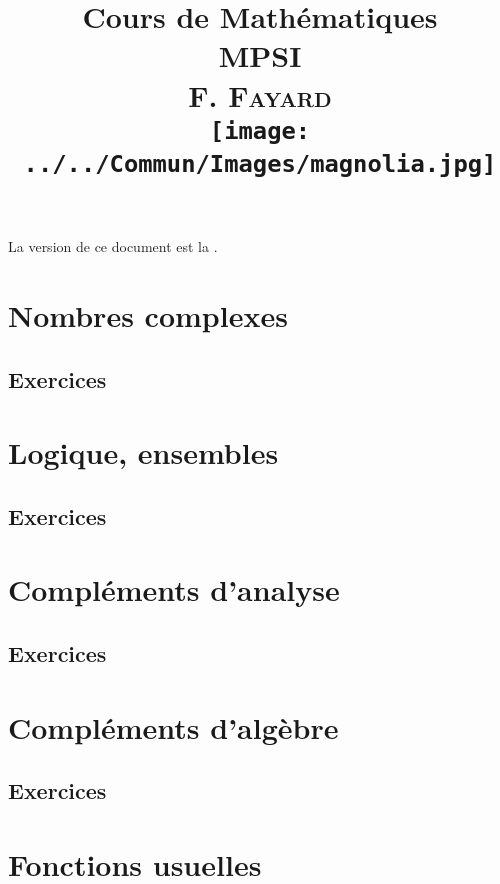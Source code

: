 \documentclass[book]{magnolia}
\title{{\Huge\bf Cours de Mathématiques}\\\vspace{1cm}
       \textbf{\Huge MPSI}\\\vspace{1cm}
       \textsc{F. Fayard}\\\vspace{1cm}
       \texttt{[image: ../../Commun/Images/magnolia.jpg]}}
\begin{document}
\maketitle

La version de ce document est la \textsc{\GITAbrHash}.


\tableofcontents


\chapter{Nombres complexes}
\setcounter{numeroexercicecours}{1}

\section{Exercices}
\setcounter{numeroexercice}{1}


\chapter{Logique, ensembles}
\setcounter{numeroexercicecours}{1}

\section{Exercices}
\setcounter{numeroexercice}{1}


\chapter{Compléments d'analyse}
\setcounter{numeroexercicecours}{1}

\section{Exercices}
\setcounter{numeroexercice}{1}


\chapter{Compléments d'algèbre}
\setcounter{numeroexercicecours}{1}
\setcounter{numeroexercicecours}{1}

\section{Exercices}
\setcounter{numeroexercice}{1}


\chapter{Fonctions usuelles}
\setcounter{numeroexercicecours}{1}

\end{document}
